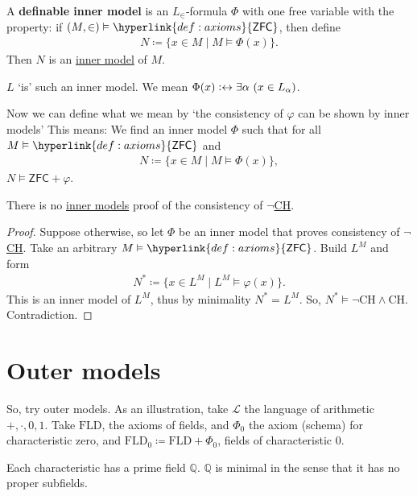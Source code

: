 \documentclass{article}
\newcommand{\named}[1]{\textbf{#1}\index{#1}}
\newcommand{\1}{\mathbbm{1}}
\let\models\vDash
\begin{document}
\begin{defi}
  A \named{definable inner model} is an $L_\in$-formula $\Phi$ with one free variable with the property: if $(M,\in) \models \hyperlink{def:axioms}{\textsf{ZFC}}$, then define
  \begin{align*}
    N \coloneqq \{x \in M \mid M \models \Phi(x)\}.
  \end{align*}
  Then $N$ is an \hyperlink{def:innerModel}{inner model} of $M$.
\end{defi}
\begin{eg}
  $L$ `is' such an inner model. We mean $\Phi(x) \vcentcolon\leftrightarrow \exists \alpha\ (x \in L_\alpha)$.
\end{eg}
Now we can define what we mean by
`the consistency of $\varphi$ can be shown by inner models'
This means: We find an inner model $\Phi$ such that for all $M \models \hyperlink{def:axioms}{\textsf{ZFC}}$ and
\begin{align*}
N \coloneqq \{x \in M \mid M \models \Phi(x)\},
\end{align*}
$N \models \textsf{ZFC}+\varphi$.
\begin{cor}
  There is no \hyperlink{def:innerModel}{inner models} proof of the consistency of $\neg$\hyperlink{def:ch}{CH}.
\end{cor}
\begin{proof}
  Suppose otherwise, so let $\Phi$ be an inner model that proves consistency of $\neg$\hyperlink{def:ch}{CH}.
  Take an arbitrary $M \models \hyperlink{def:axioms}{\textsf{ZFC}}$. Build $L^M$ and form
  \begin{align*}
  N^* \coloneqq \{x \in L^M \mid L^M \models \varphi(x)\}.
  \end{align*}
  This is an inner model of $L^M$, thus by minimality $N^* = L^M$. So, $N^* \models \neg\text{CH} \land \text{CH}$.
  Contradiction.
\end{proof}

\clearpage
\section{Outer models}
So, try outer models.
As an illustration, take $\mathcal{L}$ the language of arithmetic $+,\cdot,0,1$.
Take $\text{FLD}$, the axioms of fields, and $\Phi_0$ the axiom (schema) for characteristic zero, and $\text{FLD}_0 \coloneqq \text{FLD}+\Phi_0$, fields of characteristic $0$.

Each characteristic has a prime field $\mathbb{Q}$. $\mathbb{Q}$ is minimal in the sense that it has no proper subfields.
\end{document}
